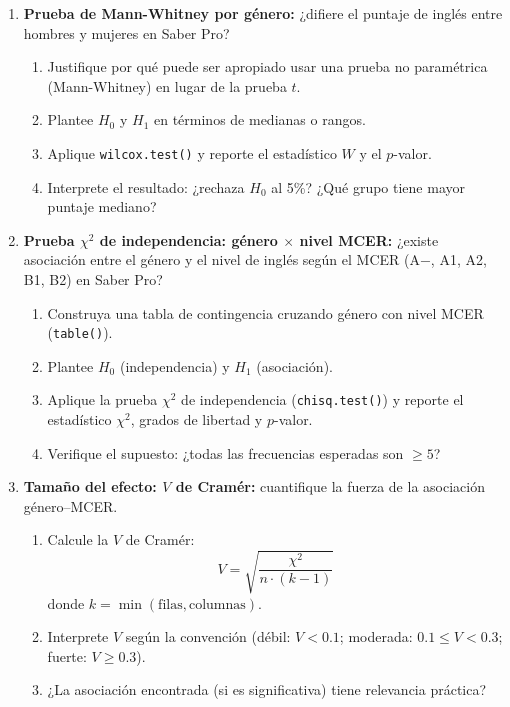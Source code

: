 \documentclass[11pt, a4paper]{article}
\begin{document}
\begin{enumerate}[label=\arabic*)]
  \item \textbf{Prueba de Mann-Whitney por g\'enero:} ¿difiere el puntaje de
        ingl\'es entre hombres y mujeres en Saber Pro?
        \begin{enumerate}[label=\alph*)]
          \item Justifique por qu\'e puede ser apropiado usar una prueba no
                param\'etrica (Mann-Whitney) en lugar de la prueba $t$.
          \item Plantee $H_0$ y $H_1$ en t\'erminos de medianas o rangos.
          \item Aplique \texttt{wilcox.test()} y reporte el estad\'istico $W$
                y el $p$-valor.
          \item Interprete el resultado: ¿rechaza $H_0$ al 5\%? ¿Qu\'e grupo
                tiene mayor puntaje mediano?
        \end{enumerate}

  \item \textbf{Prueba $\chi^2$ de independencia: g\'enero $\times$ nivel MCER:}
        ¿existe asociaci\'on entre el g\'enero y el nivel de ingl\'es seg\'un
        el MCER (A$-$, A1, A2, B1, B2) en Saber Pro?
        \begin{enumerate}[label=\alph*)]
          \item Construya una tabla de contingencia cruzando g\'enero con
                nivel MCER (\texttt{table()}).
          \item Plantee $H_0$ (independencia) y $H_1$ (asociaci\'on).
          \item Aplique la prueba $\chi^2$ de independencia
                (\texttt{chisq.test()}) y reporte el estad\'istico $\chi^2$,
                grados de libertad y $p$-valor.
          \item Verifique el supuesto: ¿todas las frecuencias esperadas son
                $\geq 5$?
        \end{enumerate}

  \item \textbf{Tama\~no del efecto: $V$ de Cram\'er:} cuantifique la fuerza
        de la asociaci\'on g\'enero--MCER.
        \begin{enumerate}[label=\alph*)]
          \item Calcule la $V$ de Cram\'er:
                \[
                  V = \sqrt{\frac{\chi^2}{n \cdot (k - 1)}}
                \]
                donde $k = \min(\text{filas}, \text{columnas})$.
          \item Interprete $V$ seg\'un la convenci\'on (d\'ebil: $V < 0.1$;
                moderada: $0.1 \leq V < 0.3$; fuerte: $V \geq 0.3$).
          \item ¿La asociaci\'on encontrada (si es significativa) tiene
                relevancia pr\'actica?
        \end{enumerate}


\end{enumerate}
\end{document}
